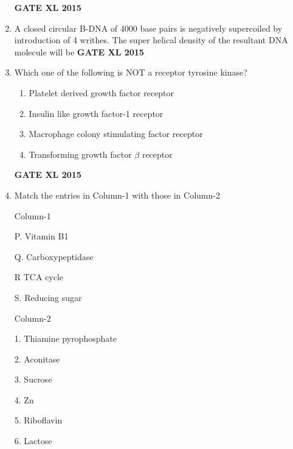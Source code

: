 \documentclass[journal,12pt,onecolumn]{IEEEtran}
\begin{document}
\begin{enumerate}
\hfill{\textbf{GATE XL 2015}}
\item A closed circular B-DNA of 4000 base pairs is negatively supercoiled by introduction of 4 writhes. The super helical density of the resultant DNA molecule will be
\hfill{\textbf{GATE XL 2015}}
\item Which one of the following is NOT a receptor tyrosine kinase?
    \begin{enumerate}
            \item Platelet derived growth factor receptor
	    \item Insulin like growth factor-1 receptor
	    \item Macrophage colony stimulating factor receptor
            \item Transforming growth factor $\beta$ receptor
    \end{enumerate}
\hfill{\textbf{GATE XL 2015}}
\item Match the entries in Column-1 with those in Column-2


	\begin{minipage}{0.5\textwidth}
		\begin{flushleft}
Column-1

P. Vitamin B1


Q. Carboxypeptidase


R TCA cycle


S. Reducing sugar

		\end{flushleft}
	\end{minipage}
	\begin{minipage}{0.5\textwidth}
		\begin{flushleft}
Column-2

1. Thiamine pyrophosphate

2. Aconitase

3. Sucrose

4. Zn

5. Riboflavin

6. Lactose


\end{flushleft}
\end{minipage}
\end{enumerate}
\end{document}

